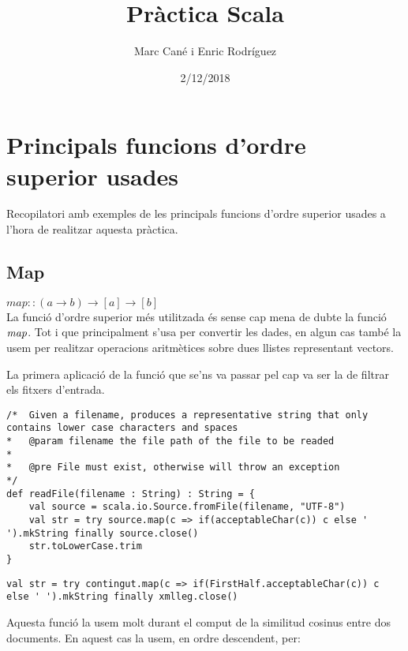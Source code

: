 \documentclass{report}
\begin{document}
\title{Pràctica Scala}
\author{Marc Cané i Enric Rodríguez}
\date{2/12/2018}
\maketitle

\newpage
\tableofcontents

\newpage
\chapter{Principals funcions d'ordre superior usades}

Recopilatori amb exemples de les principals funcions d'ordre superior usades a l'hora de realitzar aquesta pràctica.

\newpage

\section{Map}

$ map :: (a \rightarrow b) \rightarrow [a] \rightarrow [b] $ \\

La funció d'ordre superior més utilitzada és sense cap mena de dubte la funció $ \emph{map} $. Tot i que principalment s'usa per convertir les dades, en algun cas també la usem per realitzar operacions aritmètices sobre dues llistes representant vectors.

La primera aplicació de la funció que se'ns va passar pel cap va ser la de filtrar els fitxers d'entrada.

\begin{lstlisting}[style=scalaHighlight]
/*	Given a filename, produces a representative string that only contains lower case characters and spaces
* 	@param filename the file path of the file to be readed
* 	
* 	@pre File must exist, otherwise will throw an exception
*/
def readFile(filename : String) : String = {
	val source = scala.io.Source.fromFile(filename, "UTF-8")
	val str = try source.map(c => if(acceptableChar(c)) c else ' ').mkString finally source.close()
	str.toLowerCase.trim
}
\end{lstlisting}

\begin{lstlisting}[style=scalaHighlight]
val str = try contingut.map(c => if(FirstHalf.acceptableChar(c)) c else ' ').mkString finally xmlleg.close()
\end{lstlisting}

Aquesta funció la usem molt durant el comput de la similitud cosinus entre dos documents. En aquest cas la usem, en ordre descendent, per:
\end{document}
